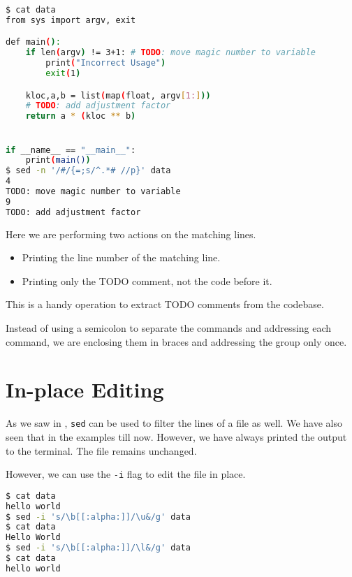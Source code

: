 \begin{lstlisting}[language=bash]
$ cat data
from sys import argv, exit

def main():
    if len(argv) != 3+1: # TODO: move magic number to variable
        print("Incorrect Usage")
        exit(1)

    kloc,a,b = list(map(float, argv[1:]))
    # TODO: add adjustment factor
    return a * (kloc ** b)


if __name__ == "__main__":
    print(main())
$ sed -n '/#/{=;s/^.*# //p}' data
4
TODO: move magic number to variable
9
TODO: add adjustment factor
\end{lstlisting}

Here we are performing two actions on the matching lines.
\begin{itemize}
\item Printing the line number of the matching line.
\item Printing only the TODO comment, not the code before it.
\end{itemize}

This is a handy operation to extract TODO comments from the codebase.

Instead of using a semicolon to separate the commands and addressing each command, we are enclosing them in braces and addressing the group only once.

\section{In-place Editing}

As we saw in , \lstinline|sed| can be used to filter the lines of a file as well. We have also seen that in the examples till now.
However, we have always printed the output to the terminal.
The file remains unchanged.

However, we can use the \lstinline|-i| flag to edit the file in place.

\begin{lstlisting}[language=bash]
$ cat data
hello world
$ sed -i 's/\b[[:alpha:]]/\u&/g' data
$ cat data
Hello World
$ sed -i 's/\b[[:alpha:]]/\l&/g' data
$ cat data
hello world
\end{lstlisting}

